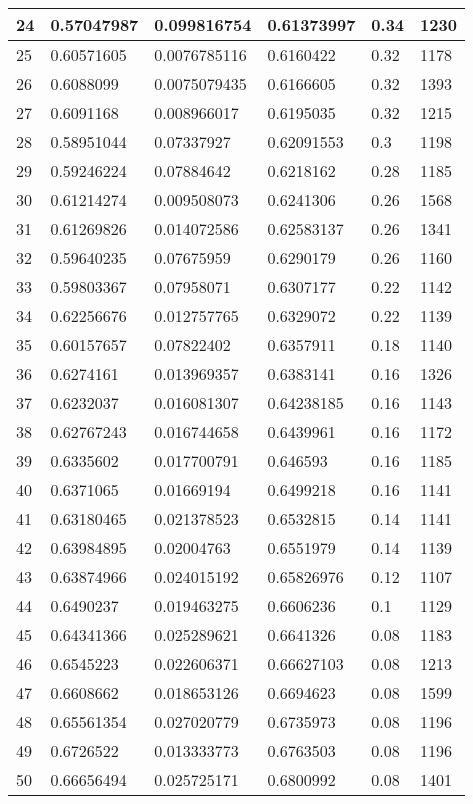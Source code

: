 \begin{longtable}{|l|l|l|l|l|l|}
24 & 0.57047987 & 0.099816754 & 0.61373997 & 0.34 & 1230 \\ \hline 
25 & 0.60571605 & 0.0076785116 & 0.6160422 & 0.32 & 1178 \\ \hline 
26 & 0.6088099 & 0.0075079435 & 0.6166605 & 0.32 & 1393 \\ \hline 
27 & 0.6091168 & 0.008966017 & 0.6195035 & 0.32 & 1215 \\ \hline 
28 & 0.58951044 & 0.07337927 & 0.62091553 & 0.3 & 1198 \\ \hline 
29 & 0.59246224 & 0.07884642 & 0.6218162 & 0.28 & 1185 \\ \hline 
30 & 0.61214274 & 0.009508073 & 0.6241306 & 0.26 & 1568 \\ \hline 
31 & 0.61269826 & 0.014072586 & 0.62583137 & 0.26 & 1341 \\ \hline 
32 & 0.59640235 & 0.07675959 & 0.6290179 & 0.26 & 1160 \\ \hline 
33 & 0.59803367 & 0.07958071 & 0.6307177 & 0.22 & 1142 \\ \hline 
34 & 0.62256676 & 0.012757765 & 0.6329072 & 0.22 & 1139 \\ \hline 
35 & 0.60157657 & 0.07822402 & 0.6357911 & 0.18 & 1140 \\ \hline 
36 & 0.6274161 & 0.013969357 & 0.6383141 & 0.16 & 1326 \\ \hline 
37 & 0.6232037 & 0.016081307 & 0.64238185 & 0.16 & 1143 \\ \hline 
38 & 0.62767243 & 0.016744658 & 0.6439961 & 0.16 & 1172 \\ \hline 
39 & 0.6335602 & 0.017700791 & 0.646593 & 0.16 & 1185 \\ \hline 
40 & 0.6371065 & 0.01669194 & 0.6499218 & 0.16 & 1141 \\ \hline 
41 & 0.63180465 & 0.021378523 & 0.6532815 & 0.14 & 1141 \\ \hline 
42 & 0.63984895 & 0.02004763 & 0.6551979 & 0.14 & 1139 \\ \hline 
43 & 0.63874966 & 0.024015192 & 0.65826976 & 0.12 & 1107 \\ \hline 
44 & 0.6490237 & 0.019463275 & 0.6606236 & 0.1 & 1129 \\ \hline 
45 & 0.64341366 & 0.025289621 & 0.6641326 & 0.08 & 1183 \\ \hline 
46 & 0.6545223 & 0.022606371 & 0.66627103 & 0.08 & 1213 \\ \hline 
47 & 0.6608662 & 0.018653126 & 0.6694623 & 0.08 & 1599 \\ \hline 
48 & 0.65561354 & 0.027020779 & 0.6735973 & 0.08 & 1196 \\ \hline 
49 & 0.6726522 & 0.013333773 & 0.6763503 & 0.08 & 1196 \\ \hline 
50 & 0.66656494 & 0.025725171 & 0.6800992 & 0.08 & 1401 \\ \hline 
\end{longtable}